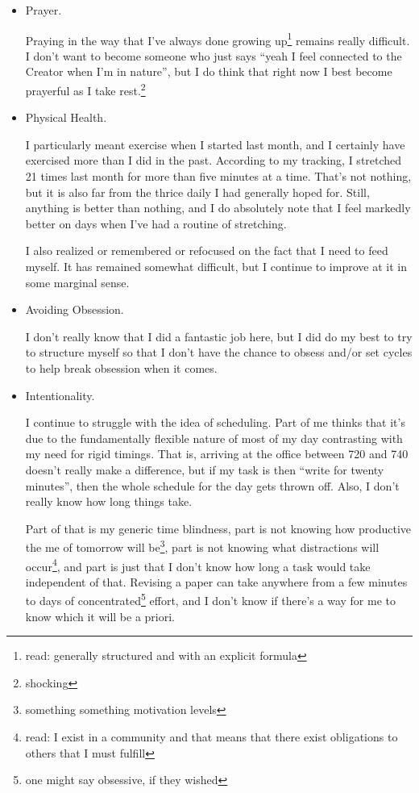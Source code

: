 \documentclass[12pt]{article}
\newcommand{\say}[1]{``#1''}
\renewcommand{\,}{\textsuperscript{,}}
\begin{document}
\begin{itemize}

\item Prayer.

Praying in the way that I've always done growing up\footnote{read: generally structured and with an explicit formula} remains really difficult.  
I don't want to become someone who just says \say{yeah I feel connected to the Creator when I'm in nature}, but I do think that right now I best become prayerful as I take rest.\footnote{shocking}

\item Physical Health.

I particularly meant exercise when I started last month, and I certainly have exercised more than I did in the past.  
According to my tracking, I stretched 21 times last month for more than five minutes at a time.  
That's not nothing, but it is also far from the thrice daily I had generally hoped for.  
Still, anything is better than nothing, and I do absolutely note that I feel markedly better on days when I've had a routine of stretching.

I also realized or remembered or refocused on the fact that I need to feed myself.  
It has remained somewhat difficult, but I continue to improve at it in some marginal sense.

\item Avoiding Obsession.

I don't really know that I did a fantastic job here, but I did do my best to try to structure myself so that I don't have the chance to obsess and/or set cycles to help break obsession when it comes.

\item Intentionality.

I continue to struggle with the idea of scheduling.  
Part of me thinks that it's due to the fundamentally flexible nature of most of my day contrasting with my need for rigid timings.  
That is, arriving at the office between 720 and 740 doesn't really make a difference, but if my task is then \say{write for twenty minutes}, then the whole schedule for the day gets thrown off.  
Also, I don't really know how long things take.

Part of that is my generic time blindness, part is not knowing how productive the me of tomorrow will be\footnote{something something motivation levels}, part is not knowing what distractions will occur\footnote{read: I exist in a community and that means that there exist obligations to others that I must fulfill}, and part is just that I don't know how long a task would take independent of that.  
Revising a paper can take anywhere from a few minutes to days of concentrated\footnote{one might say obsessive, if they wished} effort, and I don't know if there's a way for me to know which it will be a priori.


\end{itemize}
\end{document}
